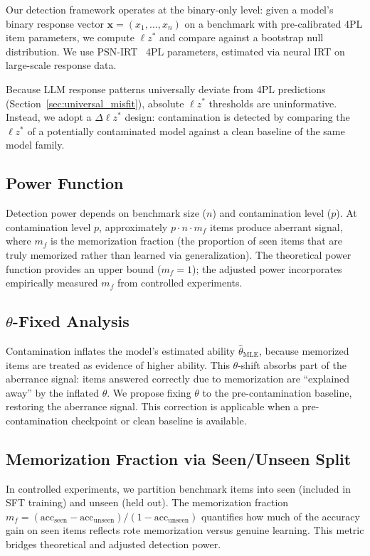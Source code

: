\documentclass[11pt,a4paper]{article}
\newcommand{\lzstar}{\ensuremath{\ell z^*}}
\begin{document}
Our detection framework operates at the binary-only level: given a model's binary response vector $\mathbf{x} = (x_1, \ldots, x_n)$ on a benchmark with pre-calibrated 4PL item parameters, we compute $\lzstar$ and compare against a bootstrap null distribution.
We use PSN-IRT~\citep{psnirt2026} 4PL parameters, estimated via neural IRT on large-scale response data.

Because LLM response patterns universally deviate from 4PL predictions (Section~\ref{sec:universal_misfit}), absolute $\lzstar$ thresholds are uninformative.
Instead, we adopt a $\Delta\lzstar$ design: contamination is detected by comparing the $\lzstar$ of a potentially contaminated model against a clean baseline of the same model family.

\subsection{Power Function}
\label{sec:power_function}

Detection power depends on benchmark size ($n$) and contamination level ($p$).
At contamination level $p$, approximately $p \cdot n \cdot m_f$ items produce aberrant signal, where $m_f$ is the memorization fraction (the proportion of seen items that are truly memorized rather than learned via generalization).
The theoretical power function provides an upper bound ($m_f = 1$); the adjusted power incorporates empirically measured $m_f$ from controlled experiments.

\subsection{$\theta$-Fixed Analysis}

Contamination inflates the model's estimated ability $\hat\theta_{\text{MLE}}$, because memorized items are treated as evidence of higher ability.
This $\theta$-shift absorbs part of the aberrance signal: items answered correctly due to memorization are ``explained away'' by the inflated $\theta$.
We propose fixing $\theta$ to the pre-contamination baseline, restoring the aberrance signal.
This correction is applicable when a pre-contamination checkpoint or clean baseline is available.

\subsection{Memorization Fraction via Seen/Unseen Split}

In controlled experiments, we partition benchmark items into seen (included in SFT training) and unseen (held out).
The memorization fraction $m_f = (\text{acc}_{\text{seen}} - \text{acc}_{\text{unseen}}) / (1 - \text{acc}_{\text{unseen}})$ quantifies how much of the accuracy gain on seen items reflects rote memorization versus genuine learning.
This metric bridges theoretical and adjusted detection power.
\end{document}
